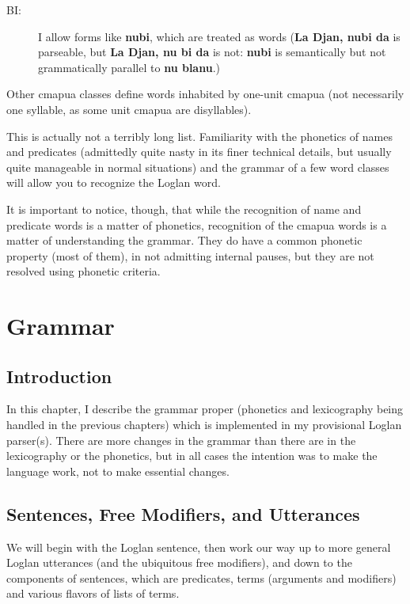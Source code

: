 \documentclass[12pt]{book}
\begin{document}
{\begin{description}
\item[BI:]  I allow forms like {\bf nubi}, which are treated as words ({\bf La Djan, nubi da} is parseable, but {\bf La Djan, nu bi da} is not:  {\bf nubi} is semantically but not grammatically parallel to {\bf nu blanu}.)

\end{description}

Other cmapua classes define words inhabited by one-unit cmapua (not necessarily one syllable, as some unit cmapua are disyllables).

This is actually not a terribly long list.  Familiarity with the phonetics of names and predicates (admittedly quite nasty in its finer technical details, but usually quite manageable in normal situations) and the grammar of a few word classes will allow you to recognize the Loglan word.   

It is important to notice, though, that while the recognition of name and predicate words is a matter of phonetics, recognition of the cmapua words is a matter of understanding the grammar.  They do have a common phonetic property (most of them), in not admitting internal pauses, but they are not resolved using phonetic criteria.

\chapter{Grammar}

\section{Introduction}

In this chapter, I describe the grammar proper (phonetics and lexicography being handled in the previous chapters) which is implemented in my provisional Loglan parser(s).  There are more changes in the grammar than there are in the lexicography or the phonetics, but in all cases the intention was to make the language work, not to make essential changes.

\section{Sentences, Free Modifiers, and Utterances}

We will begin with the Loglan sentence, then work our way up to more general Loglan utterances (and the ubiquitous free modifiers), and down to the components of sentences, which are predicates, terms (arguments and modifiers) and various flavors of lists of terms.

}
\end{document}
